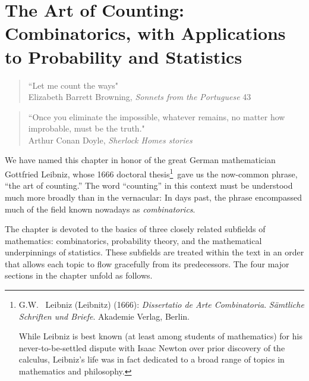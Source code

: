
\chapter{The Art of Counting:
Combinatorics, with Applications to Probability and Statistics}
\label{ch:prob-stat}
\label{ch:combinatorics}

\begin{quote}
``Let me count the ways" \\
\hspace*{1in}Elizabeth Barrett Browning, {\it Sonnets from the Portuguese} 43
\end{quote}

\bigskip

\begin{quote}
``Once you eliminate the impossible, whatever remains, no matter how improbable, must be the truth."  \\
\hspace*{1in}Arthur Conan Doyle, {\it Sherlock Homes stories}
\end{quote}

\bigskip

 

\noindent
We have named this chapter in honor of the great German mathematician Gottfried Leibniz, whose 1666 doctoral thesis\footnote{G.W.~ Leibniz (Leibnitz) (1666):  {\it Dissertatio de Arte Combinatoria}.  {\it S\"{a}mtliche Schriften und Briefe}.  Akademie Verlag, Berlin.

While Leibniz is best known (at least among students of mathematics) for his never-to-be-settled dispute with Isaac Newton over prior discovery of the calculus, Leibniz's life was in fact dedicated to a broad range of topics in mathematics and philosophy.}~gave us the now-common phrase, ``the art of counting.''  The word ``counting'' in this context must be understood much more broadly than in the vernacular: In days past, the phrase encompassed much of the field known nowadays as {\it combinatorics}. 

\medskip

The chapter is devoted to the basics of three closely related subfields of mathematics: combinatorics, probability theory, and the mathematical underpinnings of statistics.  These subfields are treated within the text in an order that allows each topic to flow gracefully from its predecessors.  The four major sections in the chapter unfold as follows.


